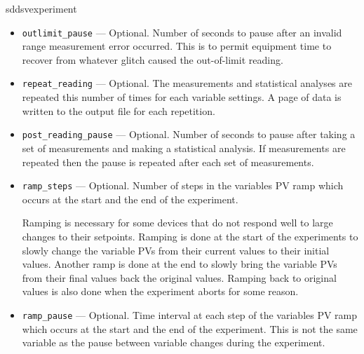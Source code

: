 \begin{sddsprog}{sddsvexperiment}
\begin{itemize}
\begin{itemize}
    \item {\verb+outlimit_pause+} --- Optional. Number of seconds to
      pause after an invalid range measurement error occurred. This is
      to permit equipment time to recover from whatever glitch caused
      the out-of-limit reading.

    \item {\verb+repeat_reading+} --- Optional. The measurements and
      statistical analyses are repeated this number of times for each
      variable settings. A page of data is written to the output file
      for each repetition.

    \item {\verb+post_reading_pause+} --- Optional. Number of seconds
      to pause after taking a set of measurements and making a
      statistical analysis.  If measurements are repeated then the
      pause is repeated after each set of measurements.

    \item {\verb+ramp_steps+} --- Optional. Number of steps in the
      variables PV ramp which occurs at the start and the end of the
      experiment.

      Ramping is necessary for some devices that do not respond well
      to large changes to their setpoints. Ramping is done at the
      start of the experiments to slowly change the variable PVs from
      their current values to their initial values. Another ramp is
      done at the end to slowly bring the variable PVs from their
      final values back the original values. Ramping back to original
      values is also done when the experiment aborts for some reason.

    \item {\verb+ramp_pause+} --- Optional. Time interval at each step
      of the variables PV ramp which occurs at the start and the end
      of the experiment. This is not the same variable as the pause
      between variable changes during the experiment.
  \end{itemize}


\end{itemize}
\end{sddsprog}
